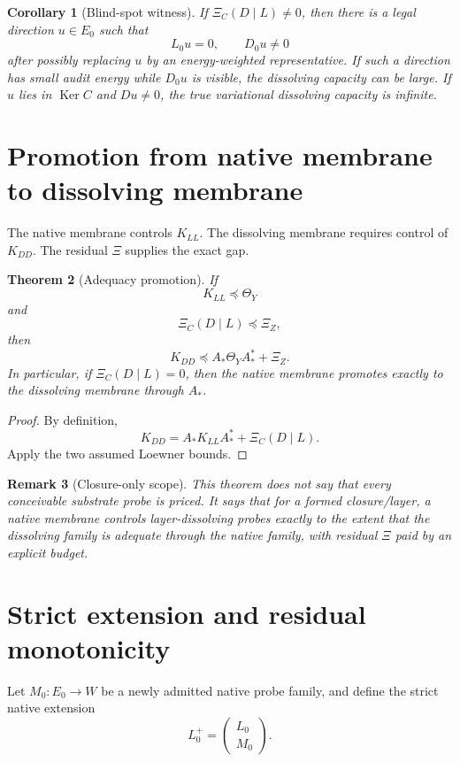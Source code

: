 \documentclass[11pt]{article}
\newtheorem{theorem}{Theorem}[section]
\newtheorem{corollary}[theorem]{Corollary}
\newtheorem{remark}[theorem]{Remark}
\newcommand{\Ker}{\operatorname{Ker}}
\begin{document}
\begin{corollary}[Blind-spot witness]
If $\Xi_C(D\mid L)\ne0$, then there is a legal direction $u\in E_0$ such that
\[
L_0u=0,
\qquad
D_0u\ne0
\]
after possibly replacing $u$ by an energy-weighted representative.  If such a direction has small audit energy while $D_0u$ is visible, the dissolving capacity can be large. If $u$ lies in $\Ker C$ and $D u\ne0$, the true variational dissolving capacity is infinite.
\end{corollary}

\section{Promotion from native membrane to dissolving membrane}

The native membrane controls $K_{LL}$.  The dissolving membrane requires control of $K_{DD}$.  The residual $\Xi$ supplies the exact gap.

\begin{theorem}[Adequacy promotion]
If
\[
K_{LL}\preceq\Theta_Y
\]
and
\[
\Xi_C(D\mid L)\preceq\Xi_Z,
\]
then
\[
\boxed{
K_{DD}\preceq A_*\Theta_YA_*^*+\Xi_Z.
}
\]
In particular, if $\Xi_C(D\mid L)=0$, then the native membrane promotes exactly to the dissolving membrane through $A_*$.
\end{theorem}

\begin{proof}
By definition,
\[
K_{DD}=A_*K_{LL}A_*^*+\Xi_C(D\mid L).
\]
Apply the two assumed Loewner bounds.
\end{proof}

\begin{remark}[Closure-only scope]
This theorem does not say that every conceivable substrate probe is priced.  It says that for a formed closure/layer, a native membrane controls layer-dissolving probes exactly to the extent that the dissolving family is adequate through the native family, with residual $\Xi$ paid by an explicit budget.
\end{remark}

\section{Strict extension and residual monotonicity}

Let $M_0:E_0\to W$ be a newly admitted native probe family, and define the strict native extension
\[
L_0^+=\begin{pmatrix}L_0\\M_0\end{pmatrix}.
\]
\end{document}
